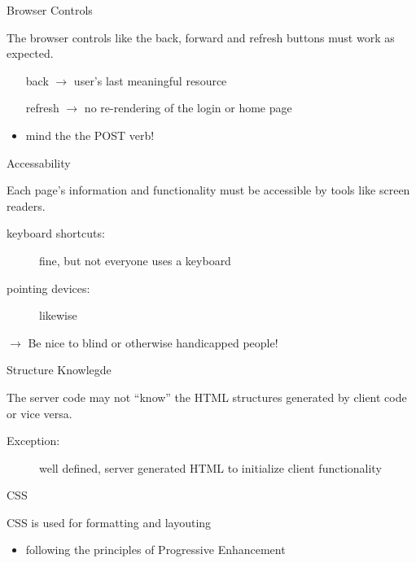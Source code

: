\documentclass{beamer}
\begin{document}
\begin{frame}{Browser Controls}

  The browser controls like the back, forward and refresh buttons must work as expected.

  \begin{itemize}
    \item[back] \ensuremath{\rightarrow} user's last meaningful resource
    \item[refresh] \ensuremath{\rightarrow} no re-rendering of the login or home page
    \item mind the the POST verb!
  \end{itemize}
\end{frame}

\begin{frame}{Accessability}

  Each page's information and functionality must be accessible by tools like screen readers.

  \begin{description}
    \item[keyboard shortcuts:] fine, but not everyone uses a keyboard
    \item[pointing devices:] likewise
  \end{description}

  \ensuremath{\rightarrow} Be nice to blind or otherwise handicapped people!
\end{frame}

\begin{frame}{Structure Knowlegde}

  The server code may not ``know'' the HTML structures generated by client code or vice versa.

  \begin{description}
    \item[Exception:] well defined, server generated HTML to initialize client functionality
  \end{description}
\end{frame}

\begin{frame}{CSS}

  CSS is used for formatting and layouting

  \begin{itemize}
    \item following the principles of Progressive Enhancement
  \end{itemize}
\end{frame}
\end{document}
